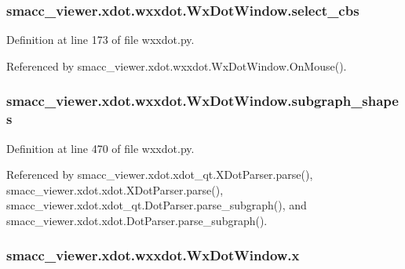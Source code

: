 \subsubsection[{\texorpdfstring{select\+\_\+cbs}{select_cbs}}]{\setlength{\rightskip}{0pt plus 5cm}smacc\+\_\+viewer.\+xdot.\+wxxdot.\+Wx\+Dot\+Window.\+select\+\_\+cbs}\hypertarget{classsmacc__viewer_1_1xdot_1_1wxxdot_1_1WxDotWindow_ae97c8b9700569078552b57fad8e105b7}{}\label{classsmacc__viewer_1_1xdot_1_1wxxdot_1_1WxDotWindow_ae97c8b9700569078552b57fad8e105b7}


Definition at line 173 of file wxxdot.\+py.



Referenced by smacc\+\_\+viewer.\+xdot.\+wxxdot.\+Wx\+Dot\+Window.\+On\+Mouse().

\subsubsection[{\texorpdfstring{subgraph\+\_\+shapes}{subgraph_shapes}}]{\setlength{\rightskip}{0pt plus 5cm}smacc\+\_\+viewer.\+xdot.\+wxxdot.\+Wx\+Dot\+Window.\+subgraph\+\_\+shapes}\hypertarget{classsmacc__viewer_1_1xdot_1_1wxxdot_1_1WxDotWindow_a05a20a1eb95d32c17486716fc2d47d35}{}\label{classsmacc__viewer_1_1xdot_1_1wxxdot_1_1WxDotWindow_a05a20a1eb95d32c17486716fc2d47d35}


Definition at line 470 of file wxxdot.\+py.



Referenced by smacc\+\_\+viewer.\+xdot.\+xdot\+\_\+qt.\+X\+Dot\+Parser.\+parse(), smacc\+\_\+viewer.\+xdot.\+xdot.\+X\+Dot\+Parser.\+parse(), smacc\+\_\+viewer.\+xdot.\+xdot\+\_\+qt.\+Dot\+Parser.\+parse\+\_\+subgraph(), and smacc\+\_\+viewer.\+xdot.\+xdot.\+Dot\+Parser.\+parse\+\_\+subgraph().

\subsubsection[{\texorpdfstring{x}{x}}]{\setlength{\rightskip}{0pt plus 5cm}smacc\+\_\+viewer.\+xdot.\+wxxdot.\+Wx\+Dot\+Window.\+x}\hypertarget{classsmacc__viewer_1_1xdot_1_1wxxdot_1_1WxDotWindow_af93c06ad884159a0fcfba52dcbc0ac54}{}\label{classsmacc__viewer_1_1xdot_1_1wxxdot_1_1WxDotWindow_af93c06ad884159a0fcfba52dcbc0ac54}


